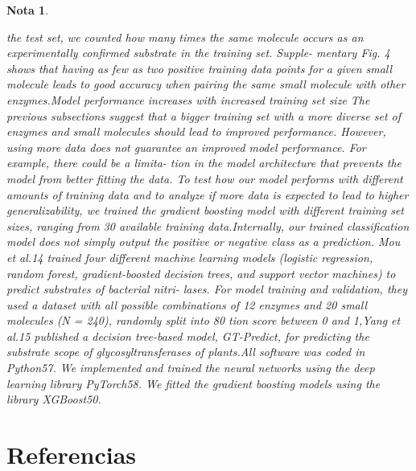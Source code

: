\documentclass[12pt]{article}
\newtheorem{Note}{Nota}%
\begin{document}
\begin{Note}
\begin{itemize}
the test set, we counted how many times the same molecule occurs as
an experimentally conﬁrmed substrate in the training set. Supple-
mentary Fig. 4 shows that having as few as two positive training data
points for a given small molecule leads to good accuracy when pairing
the same small molecule with other enzymes.Model performance increases with increased training set size
The previous subsections suggest that a bigger training set with a more
diverse set of enzymes and small molecules should lead to improved
performance. However, using more data does not guarantee an
improved model performance. For example, there could be a limita-
tion in the model architecture that prevents the model from better
ﬁtting the data. To test how our model performs with different
amounts of training data and to analyze if more data is expected to
lead to higher generalizability, we trained the gradient boosting model
with different training set sizes, ranging from 30%
available training data.Internally, our trained classiﬁcation model does not simply output the
positive or negative class as a prediction. Mou et al.14 trained four different machine learning models
(logistic regression, random forest, gradient-boosted decision trees,
and support vector machines) to predict substrates of bacterial nitri-
lases. For model training and validation, they used a dataset with all
possible combinations of 12 enzymes and 20 small molecules
(N = 240), randomly split into 80%
tion score between 0 and 1,Yang et al.15 published a decision tree-based model, GT-Predict,
for predicting the substrate scope of glycosyltransferases of plants.All software was coded in Python57. We implemented and trained the
neural networks using the deep learning library PyTorch58. We ﬁtted
the gradient boosting models using the library XGBoost50.
\end{itemize}

\end{Note}





\section{Referencias}
\end{document}
